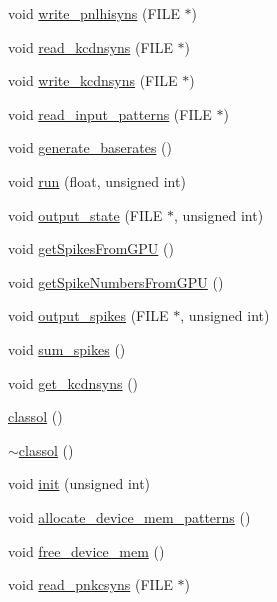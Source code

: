 \begin{DoxyCompactItemize}
\item 
void \hyperlink{classclassol_a661def594f59444eac7a0a08e599ec07}{write\+\_\+pnlhisyns} (F\+I\+L\+E $\ast$)
\item 
void \hyperlink{classclassol_a5530acb74e884fe7b802e2e6eaec9c3a}{read\+\_\+kcdnsyns} (F\+I\+L\+E $\ast$)
\item 
void \hyperlink{classclassol_ad409b77aceb2136bbc069b1ec55d7998}{write\+\_\+kcdnsyns} (F\+I\+L\+E $\ast$)
\item 
void \hyperlink{classclassol_a554e027fafa47fbf9ee68e9e5bd91de2}{read\+\_\+input\+\_\+patterns} (F\+I\+L\+E $\ast$)
\item 
void \hyperlink{classclassol_a4e4e5bee0655e84dfee6e98e6a75dc3b}{generate\+\_\+baserates} ()
\item 
void \hyperlink{classclassol_ae907498a8660fe41f7d9b41aad6e5d10}{run} (float, unsigned int)
\item 
void \hyperlink{classclassol_a88179d17f4ea568b7b58a329a741eb53}{output\+\_\+state} (F\+I\+L\+E $\ast$, unsigned int)
\item 
void \hyperlink{classclassol_ae571e028c069103e19bb4975bdb0dd47}{get\+Spikes\+From\+G\+P\+U} ()
\item 
void \hyperlink{classclassol_a08d82fc16288158062aef866a1e29a65}{get\+Spike\+Numbers\+From\+G\+P\+U} ()
\item 
void \hyperlink{classclassol_a54d61e7df53d16d7b8e1de46bcca6c6c}{output\+\_\+spikes} (F\+I\+L\+E $\ast$, unsigned int)
\item 
void \hyperlink{classclassol_af9dfaa92f0e4737dbadd9ec9cd203555}{sum\+\_\+spikes} ()
\item 
void \hyperlink{classclassol_af4700403ad71ef8d07c67883ad914f75}{get\+\_\+kcdnsyns} ()
\item 
\hyperlink{classclassol_a0f4a2bbdd48bcdfcc2abaa58a839232c}{classol} ()
\item 
\hyperlink{classclassol_a1273a6a57e2127a7b028bdbd92fed9b4}{$\sim$classol} ()
\item 
void \hyperlink{classclassol_ae1d319555e41d814ef2f8407418df8dc}{init} (unsigned int)
\item 
void \hyperlink{classclassol_a224bf755bd74d7512606518ae2658215}{allocate\+\_\+device\+\_\+mem\+\_\+patterns} ()
\item 
void \hyperlink{classclassol_ade653847f5de20fe2f944260d532ddf9}{free\+\_\+device\+\_\+mem} ()
\item 
void \hyperlink{classclassol_a1529539e9d2424d56016ad8e60aa0b79}{read\+\_\+pnkcsyns} (F\+I\+L\+E $\ast$)

\end{DoxyCompactItemize}
